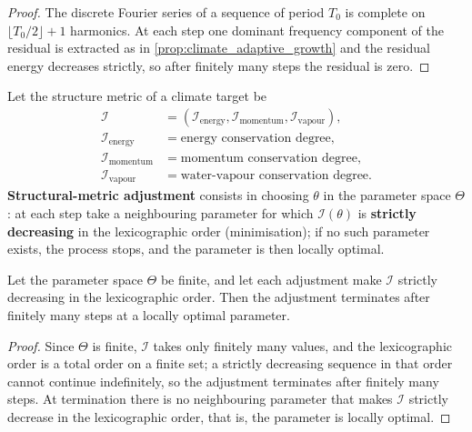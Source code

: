 \begin{proof}
The discrete Fourier series of a sequence of period $T_0$ is complete on $\lfloor T_0/2\rfloor+1$ harmonics. At each step one dominant frequency component of the residual is extracted as in \cref{prop:climate_adaptive_growth} and the residual energy decreases strictly, so after finitely many steps the residual is zero.
\end{proof}

\begin{definition}\label{def:climate_structure_metric_adjustment}
Let the structure metric of a climate target be
\[
\begin{aligned}
\mathcal I&=(\mathcal I_{\text{energy}},\mathcal I_{\text{momentum}},\mathcal I_{\text{vapour}}),\\
\mathcal I_{\text{energy}}&=\text{energy conservation degree},\\
\mathcal I_{\text{momentum}}&=\text{momentum conservation degree},\\
\mathcal I_{\text{vapour}}&=\text{water-vapour conservation degree}.
\end{aligned}
\]
\textbf{Structural-metric adjustment} consists in choosing $\theta$ in the parameter space $\Theta$: at each step take a neighbouring parameter for which $\mathcal I(\theta)$ is \textbf{strictly decreasing} in the lexicographic order (minimisation); if no such parameter exists, the process stops, and the parameter is then locally optimal.
\end{definition}

\begin{proposition}\label{prop:climate_structure_metric_convergence}
Let the parameter space $\Theta$ be finite, and let each adjustment make $\mathcal I$ strictly decreasing in the lexicographic order. Then the adjustment terminates after finitely many steps at a locally optimal parameter.
\end{proposition}

\begin{proof}
Since $\Theta$ is finite, $\mathcal I$ takes only finitely many values, and the lexicographic order is a total order on a finite set; a strictly decreasing sequence in that order cannot continue indefinitely, so the adjustment terminates after finitely many steps. At termination there is no neighbouring parameter that makes $\mathcal I$ strictly decrease in the lexicographic order, that is, the parameter is locally optimal.
\end{proof}

